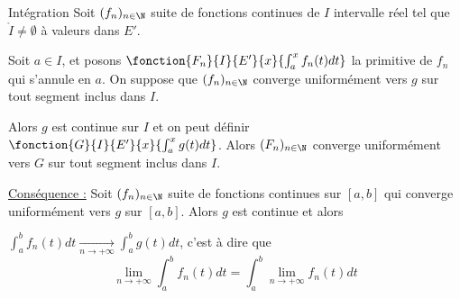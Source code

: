 \begin{theoreme}{Intégration}{}
    Soit $(f_n)_{n \in \N}$ suite de fonctions continues de $I$ intervalle réel tel que 
    $\mathring I \neq \emptyset$ à valeurs dans $E'$. 

    Soit $a \in I$, et posons $\fonction{F_n}{I}{E'}{x}{\int_a^x f_n(t) dt}$ la primitive de 
    $f_n$ qui s'annule en $a$. On suppose que $(f_n)_{n \in \N}$ converge uniformément vers $g$ 
    sur tout segment inclus dans $I$.

    Alors $g$ est continue sur $I$ et on peut définir $\fonction{G}{I}{E'}{x}{\int_a^x g(t) dt}$. 
    Alors $(F_n)_{n \in \N}$ converge uniformément vers $G$ sur tout segment inclus dans $I$.

    \lvspace \uline{Conséquence :} Soit $(f_n)_{n \in \N}$ suite de fonctions continues sur 
    $[a, b]$ qui converge uniformément vers $g$ sur $[a, b]$. Alors $g$ est continue et 
    alors 
    
    $\displaystyle \int_a^b f_n(t) dt \xrightarrow[n\to +\infty]{} \int_a^b g(t) dt$, c'est à dire 
    que $$\lim_{n \to +\infty} \int_a^b f_n(t) dt = \int_a^b \lim_{n \to +\infty} f_n(t) dt$$ 
    
\end{theoreme}


